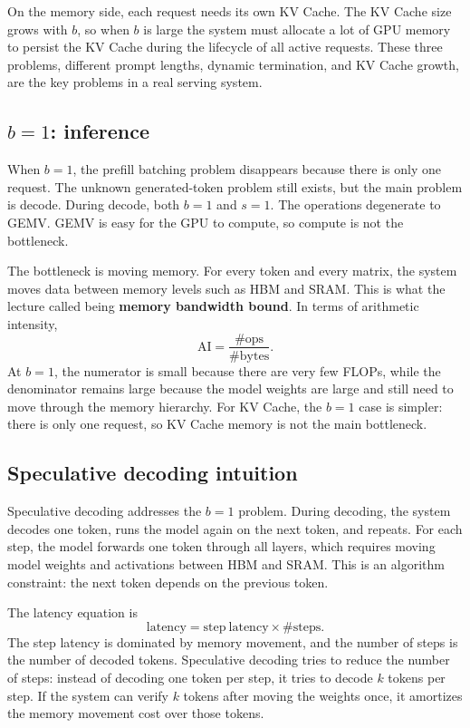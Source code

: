\documentclass[twoside]{article}
\begin{document}
On the memory side, each request needs its own KV Cache.  The KV Cache size grows with \(b\), so when \(b\) is large the system must allocate a lot of GPU memory to persist the KV Cache during the lifecycle of all active requests.  These three problems, different prompt lengths, dynamic termination, and KV Cache growth, are the key problems in a real serving system.

\subsection{\(b=1\): inference}

When \(b=1\), the prefill batching problem disappears because there is only one request.  The unknown generated-token problem still exists, but the main problem is decode.  During decode, both \(b=1\) and \(s=1\).  The operations degenerate to GEMV.  GEMV is easy for the GPU to compute, so compute is not the bottleneck.

The bottleneck is moving memory.  For every token and every matrix, the system moves data between memory levels such as HBM and SRAM.  This is what the lecture called being \textbf{memory bandwidth bound}.  In terms of arithmetic intensity,
\[
  \mathrm{AI} = \frac{\#\mathrm{ops}}{\#\mathrm{bytes}}.
\]
At \(b=1\), the numerator is small because there are very few FLOPs, while the denominator remains large because the model weights are large and still need to move through the memory hierarchy.  For KV Cache, the \(b=1\) case is simpler: there is only one request, so KV Cache memory is not the main bottleneck.

\subsection{Speculative decoding intuition}

Speculative decoding addresses the \(b=1\) problem.  During decoding, the system decodes one token, runs the model again on the next token, and repeats.  For each step, the model forwards one token through all layers, which requires moving model weights and activations between HBM and SRAM.  This is an algorithm constraint: the next token depends on the previous token.

The latency equation is
\[
  \mathrm{latency} = \mathrm{step\ latency} \times \#\mathrm{steps}.
\]
The step latency is dominated by memory movement, and the number of steps is the number of decoded tokens.  Speculative decoding tries to reduce the number of steps: instead of decoding one token per step, it tries to decode \(k\) tokens per step.  If the system can verify \(k\) tokens after moving the weights once, it amortizes the memory movement cost over those tokens.
\end{document}
